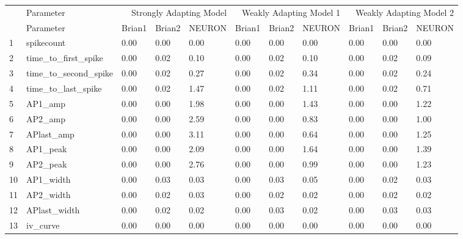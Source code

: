 \begin{tabular}{lllllllllll}
 & Parameter & \multicolumn{3}{r}{Strongly Adapting Model} & \multicolumn{3}{r}{Weakly Adapting Model 1} & \multicolumn{3}{r}{Weakly Adapting Model 2} \\
 & Parameter & Brian1 & Brian2 & NEURON & Brian1 & Brian2 & NEURON & Brian1 & Brian2 & NEURON \\
1 & spikecount & 0.00 & 0.00 & 0.00 & 0.00 & 0.00 & 0.00 & 0.00 & 0.00 & 0.00 \\
2 & time_to_first_spike & 0.00 & 0.02 & 0.10 & 0.00 & 0.02 & 0.10 & 0.00 & 0.02 & 0.09 \\
3 & time_to_second_spike & 0.00 & 0.02 & 0.27 & 0.00 & 0.02 & 0.34 & 0.00 & 0.02 & 0.24 \\
4 & time_to_last_spike & 0.00 & 0.02 & 1.47 & 0.00 & 0.02 & 1.11 & 0.00 & 0.02 & 0.71 \\
5 & AP1_amp & 0.00 & 0.00 & 1.98 & 0.00 & 0.00 & 1.43 & 0.00 & 0.00 & 1.22 \\
6 & AP2_amp & 0.00 & 0.00 & 2.59 & 0.00 & 0.00 & 0.83 & 0.00 & 0.00 & 1.00 \\
7 & APlast_amp & 0.00 & 0.00 & 3.11 & 0.00 & 0.00 & 0.64 & 0.00 & 0.00 & 1.25 \\
8 & AP1_peak & 0.00 & 0.00 & 2.09 & 0.00 & 0.00 & 1.64 & 0.00 & 0.00 & 1.39 \\
9 & AP2_peak & 0.00 & 0.00 & 2.76 & 0.00 & 0.00 & 0.99 & 0.00 & 0.00 & 1.23 \\
10 & AP1_width & 0.00 & 0.03 & 0.03 & 0.00 & 0.03 & 0.05 & 0.00 & 0.02 & 0.03 \\
11 & AP2_width & 0.00 & 0.02 & 0.03 & 0.00 & 0.02 & 0.02 & 0.00 & 0.02 & 0.02 \\
12 & APlast_width & 0.00 & 0.02 & 0.02 & 0.00 & 0.03 & 0.02 & 0.00 & 0.03 & 0.03 \\
13 & iv_curve & 0.00 & 0.00 & 0.00 & 0.00 & 0.00 & 0.00 & 0.00 & 0.00 & 0.00 \\
\end{tabular}
